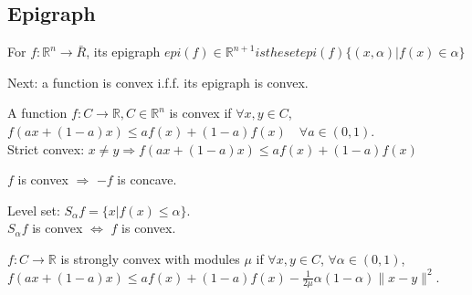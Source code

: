 \documentclass[11pt,fleqn]{book} %
\def\R{\mathbb{R}}
\begin{document}
\begin{CJK}{UTF8}{gkai}
\subsection{Epigraph} 
\begin{definition}[Epigraph]
For $f: \R^n \rightarrow \bar{R}$, its epigraph $epi(f) \in \R^{n+1} is the set epi(f) \{ (x,\alpha) | f(x) \in \alpha \}$
\end{definition}
Next: a function is convex i.f.f. its epigraph is convex.

\begin{definition}
A function $f : C \rightarrow \R, C \in \R^n$ is convex if $\forall x, y \in C$, $f(ax + (1-a)x) \le af(x) + (1-a)f(x) \quad \forall a \in (0,1)$.\\ 
Strict convex: $x \neq y \Rightarrow f(ax + (1-a)x) \le af(x) + (1-a)f(x) $
\end{definition}
\begin{remark}
$f$ is convex $\Rightarrow$ $-f$ is concave.
\end{remark}
Level set: $S_{\alpha}f = \{ x | f(x) \le \alpha \}$.\\ 
$S_{\alpha}f$ is convex $\Leftrightarrow$ $f$ is convex. \\
\begin{definition}
$f : C \rightarrow \R$ is strongly convex with modules $\mu$ if $\forall x, y \in C$, $\forall \alpha \in (0,1)$, $f(ax + (1-a)x) \le af(x) + (1-a)f(x) - \frac{1}{2\mu}\alpha(1- \alpha) \|x-y\|^2$.
\end{definition}


\end{CJK}
\end{document}
